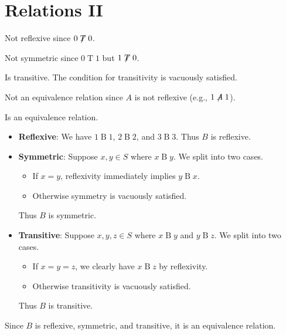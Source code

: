 \section{Relations II}
\begin{questions}
    \item \begin{partquestions}{\alph*}
        \item Not reflexive since $0\not\mathrel{T}0$.
        \item Not symmetric since $0\mathrel{T}1$ but $1\not\mathrel{T}0$.
        \item Is transitive. The condition for transitivity is vacuously satisfied.
    \end{partquestions}

    \item \begin{partquestions}{\alph*}
        \item Not an equivalence relation since $A$ is not reflexive (e.g., $1 \not\mathrel{A} 1$).
        
        \item Is an equivalence relation.
        \begin{itemize}
            \item \textbf{Reflexive}: We have $1 \mathrel{B} 1$, $2 \mathrel{B} 2$, and $3 \mathrel{B} 3$. Thus $B$ is reflexive.
            \item \textbf{Symmetric}: Suppose $x, y \in S$ where $x \mathrel{B} y$. We split into two cases.
            \begin{itemize}
                \item If $x = y$, reflexivity immediately implies $y \mathrel{B} x$.
                \item Otherwise symmetry is vacuously satisfied.
            \end{itemize}
            Thus $B$ is symmetric.
            \item \textbf{Transitive}: Suppose $x, y, z \in S$ where $x \mathrel{B} y$ and $y \mathrel{B} z$. We split into two cases.
            \begin{itemize}
                \item If $x = y = z$, we clearly have $x \mathrel{B} z$ by reflexivity.
                \item Otherwise transitivity is vacuously satisfied.
            \end{itemize}
            Thus $B$ is transitive.
        \end{itemize}
        Since $B$ is reflexive, symmetric, and transitive, it is an equivalence relation.


\end{partquestions}
\end{questions}
